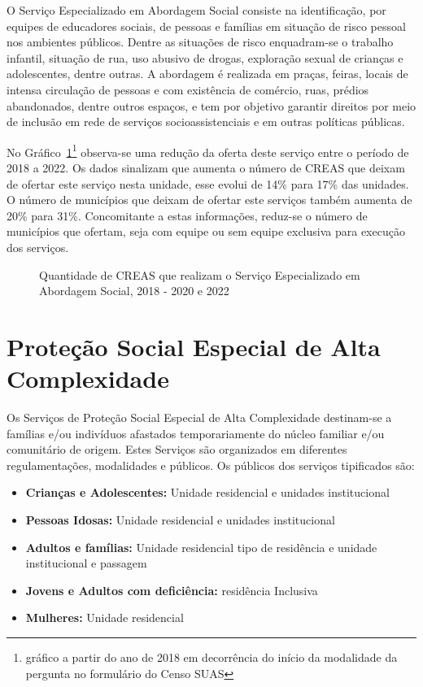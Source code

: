 \documentclass[
  letterpaper,
  DIV=11,
  numbers=noendperiod]{scrreprt}
\providecommand{\tightlist}{%
  \setlength{\itemsep}{0pt}\setlength{\parskip}{0pt}}\usepackage{longtable,booktabs,array}
\begin{document}
O Serviço Especializado em Abordagem Social consiste na identificação,
por equipes de educadores sociais, de pessoas e famílias em situação de
risco pessoal nos ambientes públicos. Dentre as situações de risco
enquadram-se o trabalho infantil, situação de rua, uso abusivo de
drogas, exploração sexual de crianças e adolescentes, dentre outras. A
abordagem é realizada em praças, feiras, locais de intensa circulação de
pessoas e com existência de comércio, ruas, prédios abandonados, dentre
outros espaços, e tem por objetivo garantir direitos por meio de
inclusão em rede de serviços socioassistenciais e em outras políticas
públicas.

No Gráfico~\ref{fig-CREAS-abordagem-social}\footnote{gráfico a partir do
  ano de 2018 em decorrência do início da modalidade da pergunta no
  formulário do Censo SUAS} observa-se uma redução da oferta deste
serviço entre o período de 2018 a 2022. Os dados sinalizam que aumenta o
número de CREAS que deixam de ofertar este serviço nesta unidade, esse
evolui de 14\% para 17\% das unidades. O número de municípios que deixam
de ofertar este serviços também aumenta de 20\% para 31\%. Concomitante
a estas informações, reduz-se o número de municípios que ofertam, seja
com equipe ou sem equipe exclusiva para execução dos serviços.

\begin{figure}


\caption{\label{fig-CREAS-abordagem-social}Quantidade de CREAS que
realizam o Serviço Especializado em Abordagem Social, 2018 - 2020 e
2022}

\end{figure}%

\section{Proteção Social Especial de Alta
Complexidade}\label{proteuxe7uxe3o-social-especial-de-alta-complexidade}

Os Serviços de Proteção Social Especial de Alta Complexidade destinam-se
a famílias e/ou indivíduos afastados temporariamente do núcleo familiar
e/ou comunitário de origem. Estes Serviços são organizados em diferentes
regulamentações, modalidades e públicos. Os públicos dos serviços
tipificados são:

\begin{itemize}
\tightlist
\item
  \textbf{Crianças e Adolescentes:} Unidade residencial e unidades
  institucional
\item
  \textbf{Pessoas Idosas:} Unidade residencial e unidades institucional
\item
  \textbf{Adultos e famílias:} Unidade residencial tipo de residência e
  unidade institucional e passagem
\item
  \textbf{Jovens e Adultos com deficiência:} residência Inclusiva
\item
  \textbf{Mulheres:} Unidade residencial
\end{itemize}
\end{document}
